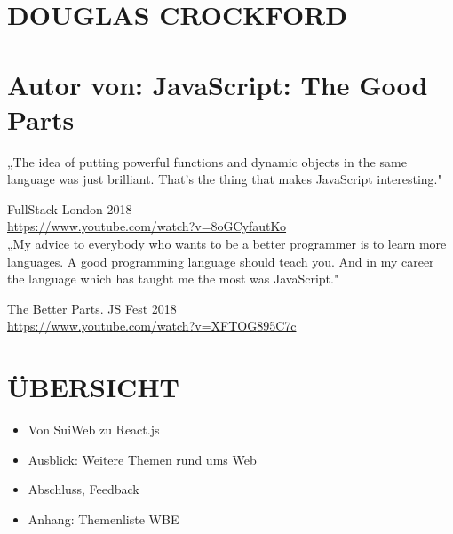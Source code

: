 \documentclass[10pt]{article}
\begin{document}
\section*{DOUGLAS CROCKFORD}
\section*{Autor von: JavaScript: The Good Parts}
„The idea of putting powerful functions and dynamic objects in the same language was just brilliant. That's the thing that makes JavaScript interesting."

FullStack London 2018\\
\href{https://www.youtube.com/watch?v=8oGCyfautKo}{https://www.youtube.com/watch?v=8oGCyfautKo}\\
„My advice to everybody who wants to be a better programmer is to learn more languages. A good programming language should teach you. And in my career the language which has taught me the most was JavaScript."

The Better Parts. JS Fest 2018\\
\href{https://www.youtube.com/watch?v=XFTOG895C7c}{https://www.youtube.com/watch?v=XFTOG895C7c}

\section*{ÜBERSICHT}
\begin{itemize}
  \item Von SuiWeb zu React.js
  \item Ausblick: Weitere Themen rund ums Web
  \item Abschluss, Feedback
  \item Anhang: Themenliste WBE
\end{itemize}
\end{document}
